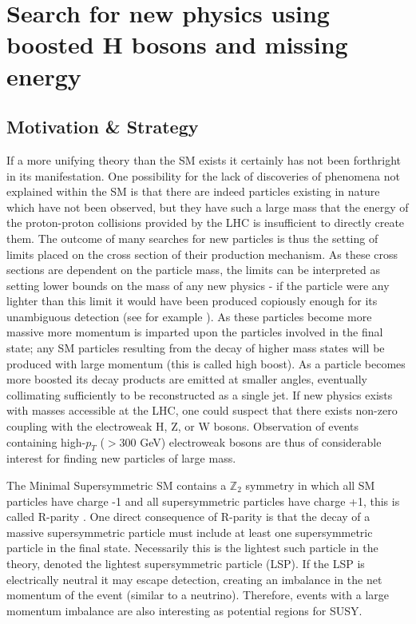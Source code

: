 \newcommand{\ttbar}{$\textrm{t}\bar{\textrm{t}}~$}
\newcommand{\bbbar}{$\textrm{b}\bar{\textrm{b}}~$}
\newcommand{\ptmiss}{$p_{T}^{\mathrm{miss}}~$}

\chapter{Search for new physics using boosted H bosons and missing energy}
\label{chap:analysis}

\section{Motivation \& Strategy}

If a more unifying theory than the SM exists it certainly has not been forthright in its manifestation. One possibility for the lack of discoveries of phenomena not explained within the SM is that there are indeed particles existing in nature which have not been observed, but they have such a large mass that the energy of the proton-proton collisions provided by the LHC is insufficient to directly create them. The outcome of many searches for new particles is thus the setting of limits placed on the cross section of their production mechanism. As these cross sections are dependent on the particle mass, the limits can be interpreted as setting lower bounds on the mass of any new physics - if the particle were any lighter than this limit it would have been produced copiously enough for its unambiguous detection (see for example \cite{CMS-SUS-16-033, CMS-SUS-15-002}). As these particles become more massive more momentum is imparted upon the particles involved in the final state; any SM particles resulting from the decay of higher mass states will be produced with large momentum (this is called high boost). As a particle becomes more boosted its decay products are emitted at smaller angles, eventually collimating sufficiently to be reconstructed as a single jet. If new physics exists with masses accessible at the LHC, one could suspect that there exists non-zero coupling with the electroweak H, Z, or W bosons. Observation of events containing high-$p_{T}$ ($>$300 GeV) electroweak bosons are thus of considerable interest for finding new particles of large mass.

The Minimal Supersymmetric SM contains a $\mathbb{Z}_{2}$ symmetry in which all SM particles have charge -1 and all supersymmetric particles have charge +1, this is called R-parity \cite{susyprimer}. One direct consequence of R-parity is that the decay of a massive supersymmetric particle must include at least one supersymmetric particle in the final state. Necessarily this is the lightest such particle in the theory, denoted the lightest supersymmetric particle (LSP). If the LSP is electrically neutral it may escape detection, creating an imbalance in the net momentum of the event (similar to a neutrino). Therefore, events with a large momentum imbalance are also interesting as potential regions for SUSY.

